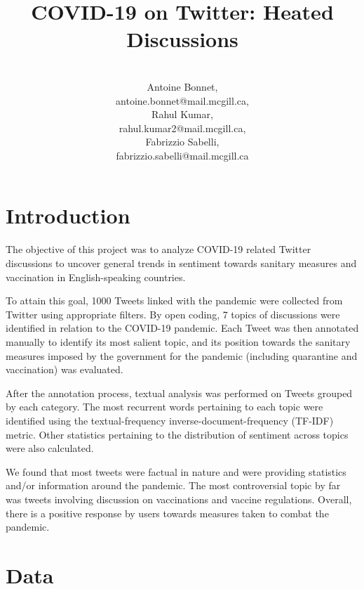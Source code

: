 \documentclass[letterpaper]{article} %
\title{COVID-19 on Twitter: Heated Discussions}
\author{  \\Antoine Bonnet, \\
antoine.bonnet@mail.mcgill.ca,
\\[3ex]
Rahul Kumar,\\
rahul.kumar2@mail.mcgill.ca, 
\\[3ex]
Fabrizzio Sabelli,\\
fabrizzio.sabelli@mail.mcgill.ca\vspace{0.5cm} }
\begin{document}


\maketitle

\section{Introduction}




The objective of this project was to analyze COVID-19 related Twitter discussions to uncover general trends in sentiment towards sanitary measures and vaccination in English-speaking countries. 


To attain this goal, 1000 Tweets linked with the pandemic were collected from Twitter using appropriate filters. By open coding, 7 topics of discussions were identified in relation to the COVID-19 pandemic. Each Tweet was then annotated manually to identify its most salient topic, and its position towards the sanitary measures imposed by the government for the pandemic (including quarantine and vaccination) was evaluated. 

After the annotation process, textual analysis was performed on Tweets grouped by each category. The most recurrent words pertaining to each topic were identified using the textual-frequency inverse-document-frequency (TF-IDF) metric. Other statistics pertaining to the distribution of sentiment across topics were also calculated. 


We found that most tweets were factual in nature and were providing
statistics and/or information around the pandemic. The most controversial topic
by far was tweets involving discussion on vaccinations and vaccine regulations.
Overall, there is a positive response by users towards measures taken to combat the pandemic.

\section{Data}
\end{document}
